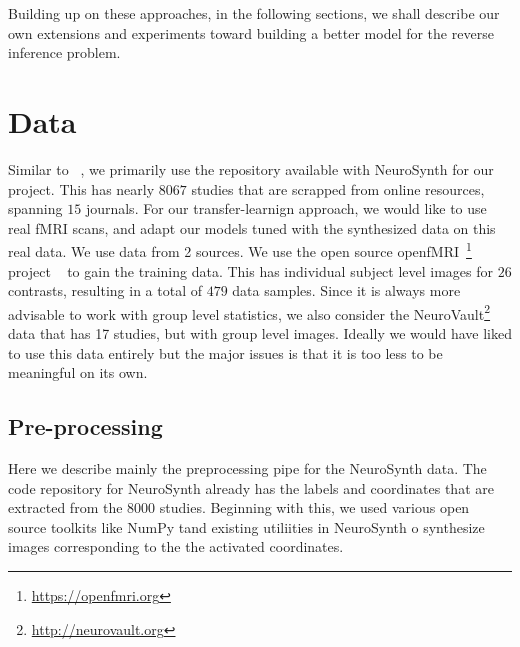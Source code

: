 \documentclass{article} %
\begin{document}
Building up on these approaches,  in the following sections, we shall describe our own extensions and experiments toward building a better model for the reverse inference problem.

\section{Data}
Similar to ~\cite{yarkoni2011large}, we primarily use the repository available with NeuroSynth for our project. This has nearly $8067$ studies that are scrapped from online resources, spanning $15$ journals. For our transfer-learnign approach, we would like to use real fMRI scans, and adapt our models tuned with the synthesized data on this real data. We use data from 2 sources. We use the open source openfMRI~\footnote{\protect \url{https://openfmri.org}} project ~\cite{poldrack2013toward} to gain the training data. This has individual subject level images for $26$ contrasts, resulting in a total of $479$ data samples. Since it is always more advisable to work with group level statistics, we also consider the NeuroVault\footnote{\protect \url{http://neurovault.org}} data that has 17 studies, but with group level images. Ideally we would have liked to use this data entirely but the major issues is that it is too less to be meaningful on its own. 
\subsection{Pre-processing}
\label{sec:preprocess}
Here we describe mainly the preprocessing pipe for the NeuroSynth data. The code repository for NeuroSynth already has the labels and coordinates that are extracted from the $8000$ studies. Beginning with this, we used various open source toolkits like NumPy tand existing utiliities in NeuroSynth o synthesize images corresponding to the the activated coordinates. 
\end{document}
